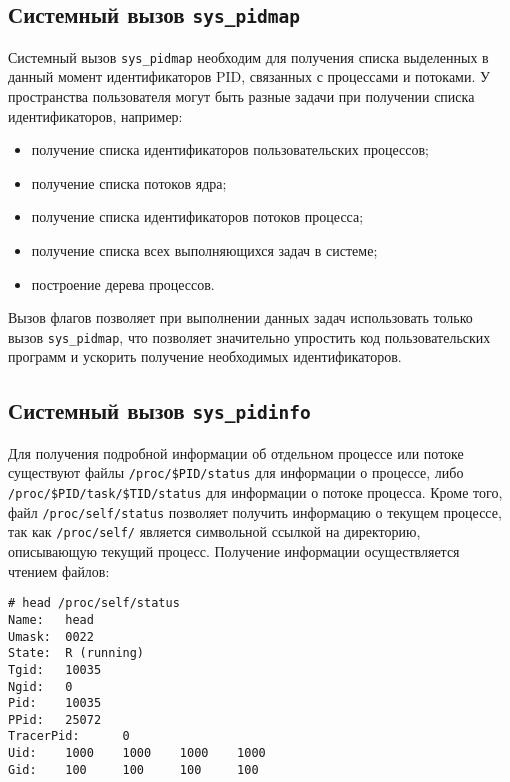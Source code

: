 \subsection{Системный вызов \texttt{sys\_pidmap}}
\label{sub:sys:sys_pidmap}

Системный вызов \texttt{sys\_pidmap} необходим для получения списка выделенных в
данный момент идентификаторов PID, связанных с процессами и потоками. У
пространства пользователя могут быть разные задачи при получении списка
идентификаторов, например:
\begin{itemize}
\item получение списка идентификаторов пользовательских процессов;
\item получение списка потоков ядра;
\item получение списка идентификаторов потоков процесса;
\item получение списка всех выполняющихся задач в системе;
\item построение дерева процессов.
\end{itemize}

Вызов флагов позволяет при выполнении данных задач использовать только вызов
\texttt{sys\_pidmap}, что позволяет значительно упростить код пользовательских
программ и ускорить получение необходимых идентификаторов.

\subsection{Системный вызов \texttt{sys\_pidinfo}}
\label{sub:sys:sys_pidinfo}

Для получения подробной информации об отдельном процессе или потоке существуют
файлы \texttt{/proc/\$PID/status} для информации о процессе, либо
\texttt{/proc/\$PID/task/\$TID/status} для информации о потоке процесса. Кроме
того, файл \texttt{/proc/self/status} позволяет получить информацию о текущем
процессе, так как \texttt{/proc/self/} является символьной ссылкой на
директорию, описывающую текущий процесс. Получение информации осуществляется
чтением файлов:

\medskip
\begin{adjustwidth}{\fivecharsapprox}{}
\begin{lstlisting}[basicstyle=\fontencoding{T1}\small\ttfamily]
# head /proc/self/status
Name:   head
Umask:  0022
State:  R (running)
Tgid:   10035
Ngid:   0
Pid:    10035
PPid:   25072
TracerPid:      0
Uid:    1000    1000    1000    1000
Gid:    100     100     100     100
\end{lstlisting}
\end{adjustwidth}
\medskip

